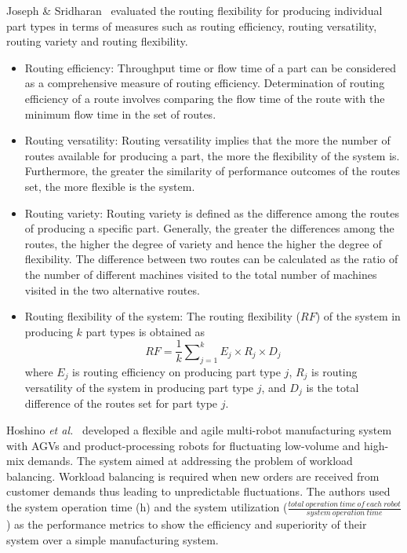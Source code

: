 Joseph \& Sridharan~\cite{Joseph.2011} evaluated the routing flexibility for producing individual part types in terms of measures such as routing efficiency, routing versatility, routing variety and routing flexibility.
\begin{itemize}
    \item Routing efficiency: Throughput time or flow time of a part can be considered as a comprehensive measure of routing efficiency. Determination of routing efficiency of a route involves comparing the flow time of the route with the minimum flow time in the set of routes.

     \item Routing versatility: Routing versatility implies that the more the number of routes available for producing a part, the more the flexibility of the system is. Furthermore, the greater the similarity of performance outcomes of the routes set, the more flexible is the system.

     \item Routing variety: Routing variety is defined as the difference among the routes of producing a specific part. Generally, the greater the differences among the routes, the higher the degree of variety and hence the higher the degree of flexibility. The difference between two routes can be calculated as the ratio of the number of different machines visited to the total number of machines visited in the two alternative routes.
     \item Routing flexibility of the system: The routing flexibility ($RF$) of the system in producing $k$ part types is obtained as
        \begin{equation}
        RF=\frac{1}{k}\sum\nolimits_{j=1}^{k}E_j\times R_j\times D_j
        \end{equation}
        where $E_j$ is routing efficiency on producing part type $j$, $R_j$ is routing versatility of the system in producing part type $j$, and $D_j$ is the total difference of the routes set for part type $j$.
     \end{itemize}

Hoshino \textit{et al.}~\cite{Hoshino.2008} developed a flexible and agile multi-robot manufacturing system with AGVs and product-processing robots for fluctuating low-volume and high-mix
demands. The system aimed at addressing the problem of workload balancing. Workload balancing is required when new orders are received from customer demands thus leading to unpredictable fluctuations. The authors used the system operation time (h) and the system utilization ($\frac{total\ operation\ time\ of\ each\ robot}{system\ operation\ time}$) as the performance metrics to show the efficiency and superiority of their system over a simple manufacturing system.


